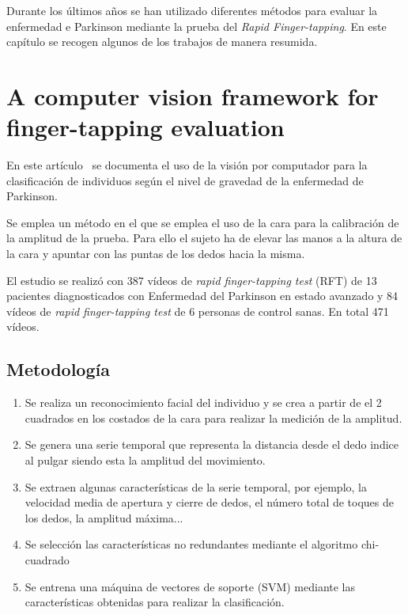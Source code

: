 
Durante los últimos años se han utilizado diferentes métodos para evaluar la enfermedad e Parkinson mediante la prueba del \textit{Rapid Finger-tapping}. En este capítulo se recogen algunos de los trabajos de manera resumida.

\section{A computer vision framework for finger-tapping evaluation}

En este artículo~\cite{khan2014computer} se documenta el uso de la visión por computador para la clasificación de individuos según el nivel de gravedad de la enfermedad de Parkinson.

Se emplea un método en el que se emplea el uso de la cara para la calibración de la amplitud de la prueba. Para ello el sujeto ha de elevar las manos a la altura de la cara y apuntar con las puntas de los dedos hacia la misma.

El estudio se realizó con 387 vídeos de \textit{rapid finger-tapping test} (RFT) de 13 pacientes diagnosticados con Enfermedad del Parkinson en estado avanzado y 84 vídeos de \textit{rapid finger-tapping test} de 6 personas de control sanas. En total 471 vídeos.

\subsection{Metodología}
\begin{enumerate}
	\item Se realiza un reconocimiento facial del individuo y se crea a partir de el 2 cuadrados en los costados de la cara para realizar la medición de la amplitud.
	\item Se genera una serie temporal que representa la distancia desde el dedo indice al pulgar siendo esta la amplitud del movimiento.
	\item Se extraen algunas características de la serie temporal, por ejemplo, la velocidad media de apertura y cierre de dedos, el número total de toques de los dedos, la amplitud máxima...
	\item Se selección las características no redundantes mediante el algoritmo chi-cuadrado
	\item Se entrena una máquina de vectores de soporte (SVM) mediante las características obtenidas para realizar la clasificación.

\end{enumerate}
